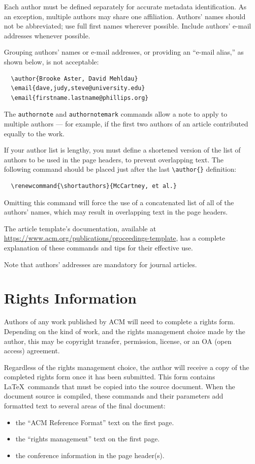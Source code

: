 \documentclass[sigplan,screen]{acmart}
\begin{document}
Each author must be defined separately for accurate metadata
identification.  As an exception, multiple authors may share one
affiliation. Authors' names should not be abbreviated; use full first
names wherever possible. Include authors' e-mail addresses whenever
possible.

Grouping authors' names or e-mail addresses, or providing an ``e-mail
alias,'' as shown below, is not acceptable:
\begin{verbatim}
  \author{Brooke Aster, David Mehldau}
  \email{dave,judy,steve@university.edu}
  \email{firstname.lastname@phillips.org}
\end{verbatim}

The \verb|authornote| and \verb|authornotemark| commands allow a note
to apply to multiple authors --- for example, if the first two authors
of an article contributed equally to the work.

If your author list is lengthy, you must define a shortened version of
the list of authors to be used in the page headers, to prevent
overlapping text. The following command should be placed just after
the last \verb|\author{}| definition:
\begin{verbatim}
  \renewcommand{\shortauthors}{McCartney, et al.}
\end{verbatim}
Omitting this command will force the use of a concatenated list of all
of the authors' names, which may result in overlapping text in the
page headers.

The article template's documentation, available at
\url{https://www.acm.org/publications/proceedings-template}, has a
complete explanation of these commands and tips for their effective
use.

Note that authors' addresses are mandatory for journal articles.

\section{Rights Information}

Authors of any work published by ACM will need to complete a rights
form. Depending on the kind of work, and the rights management choice
made by the author, this may be copyright transfer, permission,
license, or an OA (open access) agreement.

Regardless of the rights management choice, the author will receive a
copy of the completed rights form once it has been submitted. This
form contains \LaTeX\ commands that must be copied into the source
document. When the document source is compiled, these commands and
their parameters add formatted text to several areas of the final
document:
\begin{itemize}
\item the ``ACM Reference Format'' text on the first page.
\item the ``rights management'' text on the first page.
\item the conference information in the page header(s).
\end{itemize}
\end{document}
